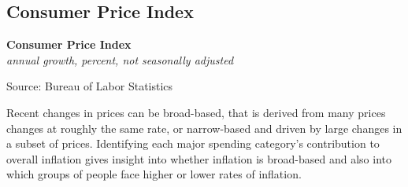 \documentclass{report}
\makeatletter
\newcommand{\tbllink}[1]{\href{https://raw.githubusercontent.com/bdecon/US-chartbook/master/chartbook/data/#1}{\faTable}}
\newcommand*\short[1]{\expandafter\@gobbletwo\number\numexpr#1\relax}
\newcommand{\dateaxisticks}{
		date coordinates in=x, axis line style={draw=none},
		xmax={2022-03-15},
		max space between ticks=40,	    
		xtick={{1990-01-01}, {1992-01-01}, {1994-01-01}, 
			{1996-01-01}, {1998-01-01}, {2000-01-01}, 
			{2002-01-01}, {2004-01-01}, {2006-01-01},
			{2008-01-01}, {2010-01-01}, {2012-01-01}, {2014-01-01},
		    {2016-01-01}, {2018-01-01}, {2020-01-01}, {2022-01-01}, 
		    {2024-01-01}, {2026-01-01}},
		minor xtick={{1989-01-01}, {1991-01-01}, {1993-01-01},
			{1995-01-01}, {1997-01-01}, {1999-01-01}, 
			{2001-01-01}, {2003-01-01}, {2005-01-01}, {2007-01-01},
		    {2009-01-01}, {2011-01-01}, {2013-01-01}, {2015-01-01},
		    {2017-01-01}, {2019-01-01}, {2021-01-01}, {2023-01-01}, 
		    {2025-01-01}, {2027-01-01}},
		enlarge y limits={0.06}, enlarge x limits={0.01},
		}
\newcommand{\bbar}[2]{extra #1 ticks = {{#2}}, extra #1 tick labels = ,
		extra #1 tick style = {grid=major, grid style={thick, black!25}},}
\newcommand{\stdline}[4]{\addplot[very thick, no markers, color=#1] 
		table [x=#2, y=#3, col sep=comma] {#4};	}
\newcommand{\rbars}{
		\fill[color=black!10] (axis cs:{1990-07-01},\pgfkeysvalueof{/pgfplots/ymin}) rectangle 
			(axis cs:{1991-03-01}, \pgfkeysvalueof{/pgfplots/ymax});
		\fill[color=black!10] (axis cs:{2007-12-01},\pgfkeysvalueof{/pgfplots/ymin}) rectangle 
			(axis cs:{2009-07-01}, \pgfkeysvalueof{/pgfplots/ymax});
		\fill[color=black!10] (axis cs:{2001-03-01},\pgfkeysvalueof{/pgfplots/ymin}) rectangle 
			(axis cs:{2001-11-01}, \pgfkeysvalueof{/pgfplots/ymax});
		\fill[color=black!10] (axis cs:{2020-02-01},\pgfkeysvalueof{/pgfplots/ymin}) rectangle 
			(axis cs:{2020-05-01}, \pgfkeysvalueof{/pgfplots/ymax});}
\makeatother
\begin{document}
{{\begin{minipage}{0.76\textwidth}
\subsection*{Consumer Price Index}
\small 
\vspace{1mm}

\normalsize \textbf{Consumer Price Index}\\
\footnotesize{\textit{annual growth, percent, not seasonally adjusted}}\\
\vspace{28mm}

\noindent \hspace{2mm} 

\footnotesize{Source: Bureau of Labor Statistics} \hfill \tbllink{cpi.csv}
\vspace{2mm}

\small Recent changes in prices can be broad-based, that is derived from many prices changes at roughly the same rate, or narrow-based and driven by large changes in a subset of prices. Identifying each major spending category's contribution to overall inflation gives insight into whether inflation is broad-based and also into which groups of people face higher or lower rates of inflation.
\end{minipage}

}}
\end{document}
